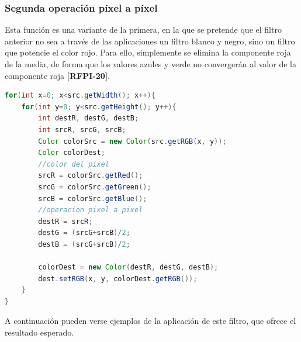 \subsubsection{Segunda operación píxel a píxel}
Esta función es una variante de la primera, en la que se pretende que el filtro anterior no sea a través de las aplicaciones un filtro blanco y negro, sino un filtro que potencie el color rojo. Para ello, simplemente se elimina la componente roja de la media, de forma que los valores azules y verde no convergerán al valor de la componente roja \textbf{[RFPI-20]}.
\vskip0.3cm
\begin{lstlisting}[language=Java, caption=Operación pixel a pixel, label=lst:graddesc]
for(int x=0; x<src.getWidth(); x++){
    for(int y=0; y<src.getHeight(); y++){
        int destR, destG, destB;
        int srcR, srcG, srcB;
        Color colorSrc = new Color(src.getRGB(x, y));
        Color colorDest;
        //color del pixel
        srcR = colorSrc.getRed();
        srcG = colorSrc.getGreen();
        srcB = colorSrc.getBlue();
        //operacion pixel a pixel
        destR = srcR;
        destG = (srcG+srcB)/2;
        destB = (srcG+srcB)/2;
                
        colorDest = new Color(destR, destG, destB);
        dest.setRGB(x, y, colorDest.getRGB());
    }
}
\end{lstlisting}
A continuación pueden verse ejemplos de la aplicación de este filtro, que ofrece el resultado esperado.
\vskip0.3cm
